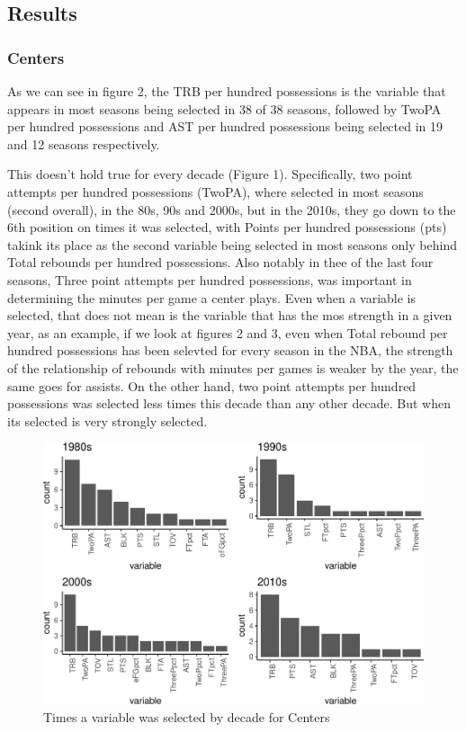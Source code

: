 \documentclass[]{elsarticle} %
\makeatletter
\def\maxwidth{\ifdim\Gin@nat@width>\linewidth\linewidth
\else\Gin@nat@width\fi}
\let\Oldincludegraphics\includegraphics
\renewcommand{\includegraphics}[1]{\Oldincludegraphics[width=\maxwidth]{#1}}
\makeatother
\begin{document}
\subsection{Results}\label{results}

\subsubsection{Centers}\label{centers}

As we can see in figure 2, the TRB per hundred possessions is the
variable that appears in most seasons being selected in 38 of 38
seasons, followed by TwoPA per hundred possessions and AST per hundred
possessions being selected in 19 and 12 seasons respectively.

This doesn't hold true for every decade (Figure 1). Specifically, two
point attempts per hundred possessions (TwoPA), where selected in most
seasons (second overall), in the 80s, 90s and 2000s, but in the 2010s,
they go down to the 6th position on times it was selected, with Points
per hundred possessions (pts) takink its place as the second variable
being selected in most seasons only behind Total rebounds per hundred
possessions. Also notably in thee of the last four seasons, Three point
attempts per hundred possessions, was important in determining the
minutes per game a center plays. Even when a variable is selected, that
does not mean is the variable that has the mos strength in a given year,
as an example, if we look at figures 2 and 3, even when Total rebound
per hundred possessions has been selevted for every season in the NBA,
the strength of the relationship of rebounds with minutes per games is
weaker by the year, the same goes for assists. On the other hand, two
point attempts per hundred possessions was selected less times this
decade than any other decade. But when its selected is very strongly
selected.

\begin{figure}[htbp]
\centering
\includegraphics{Coaching_Selection_files/figure-latex/unnamed-chunk-6-1.pdf}
\caption{Times a variable was selected by decade for Centers}
\end{figure}
\end{document}

